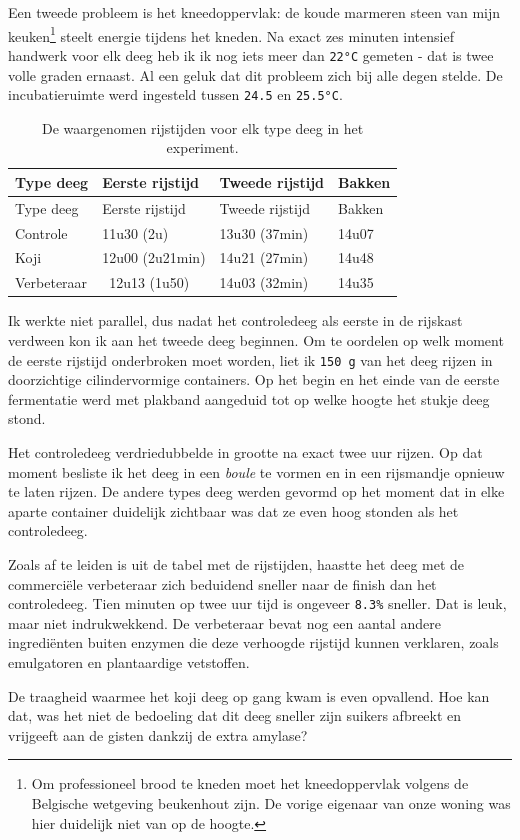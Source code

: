 \documentclass[
  11pt,
  dutch,
]{memoir}
\begin{document}
Een tweede probleem is het kneedoppervlak: de koude marmeren steen van
mijn keuken\footnote{Om professioneel brood te kneden moet het
  kneedoppervlak volgens de Belgische wetgeving beukenhout zijn. De
  vorige eigenaar van onze woning was hier duidelijk niet van op de
  hoogte.} steelt energie tijdens het kneden. Na exact zes minuten
intensief handwerk voor elk deeg heb ik ik nog iets meer dan
\texttt{22°C} gemeten - dat is twee volle graden ernaast. Al een geluk
dat dit probleem zich bij alle degen stelde. De incubatieruimte werd
ingesteld tussen \texttt{24.5} en \texttt{25.5°C}.

\begin{longtable}[]{@{}llll@{}}
\caption{De waargenomen rijstijden voor elk type deeg in het experiment.
\label{rijstable}}\tabularnewline
\toprule
Type deeg & Eerste rijstijd & Tweede rijstijd & Bakken\tabularnewline
\midrule
\endfirsthead
\toprule
Type deeg & Eerste rijstijd & Tweede rijstijd & Bakken\tabularnewline
\midrule
\endhead
Controle & 11u30 (2u) & 13u30 (37min) & 14u07\tabularnewline
Koji & 12u00 (2u21min) & 14u21 (27min) & 14u48\tabularnewline
Verbeteraar & ~12u13 (1u50) & 14u03 (32min) & 14u35\tabularnewline
\bottomrule
\end{longtable}

Ik werkte niet parallel, dus nadat het controledeeg als eerste in de
rijskast verdween kon ik aan het tweede deeg beginnen. Om te oordelen op
welk moment de eerste rijstijd onderbroken moet worden, liet ik
\texttt{150\ g} van het deeg rijzen in doorzichtige cilindervormige
containers. Op het begin en het einde van de eerste fermentatie werd met
plakband aangeduid tot op welke hoogte het stukje deeg stond.

Het controledeeg verdriedubbelde in grootte na exact twee uur rijzen. Op
dat moment besliste ik het deeg in een \emph{boule} te vormen en in een
rijsmandje opnieuw te laten rijzen. De andere types deeg werden gevormd
op het moment dat in elke aparte container duidelijk zichtbaar was dat
ze even hoog stonden als het controledeeg.

Zoals af te leiden is uit de tabel met de rijstijden, haastte het deeg
met de commerciële verbeteraar zich beduidend sneller naar de finish dan
het controledeeg. Tien minuten op twee uur tijd is ongeveer
\texttt{8.3\%} sneller. Dat is leuk, maar niet indrukwekkend. De
verbeteraar bevat nog een aantal andere ingrediënten buiten enzymen die
deze verhoogde rijstijd kunnen verklaren, zoals emulgatoren en
plantaardige vetstoffen.

De traagheid waarmee het koji deeg op gang kwam is even opvallend. Hoe
kan dat, was het niet de bedoeling dat dit deeg sneller zijn suikers
afbreekt en vrijgeeft aan de gisten dankzij de extra amylase?
\end{document}
